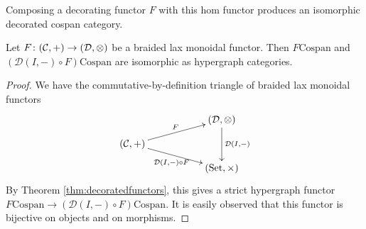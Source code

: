 Composing a decorating functor $F$ with this hom functor produces an isomorphic
decorated cospan category.

\begin{proposition} \label{prop.setdecorations}
  Let $F{\colon} (\mathcal C, +) \to (\mathcal D, \otimes)$ be a braided lax
  monoidal functor. Then $F\mathrm{Cospan}$ and $(\mathcal D(I,-)\circ
  F)\mathrm{Cospan}$ are isomorphic as hypergraph categories.
\end{proposition}
\begin{proof}
  We have the commutative-by-definition triangle of braided lax monoidal
  functors
  \[
    \xymatrixrowsep{2ex}
    \xymatrix{
      && (\mathcal D,\otimes) \ar[dd]^{\mathcal D(I,-)} \\
      (\mathcal C,+) \ar[urr]^{F} \ar[drr]_{\mathcal D(I,-)\circ F} \\
      && (\Set, \times)
    }
  \]
  By Theorem \ref{thm:decoratedfunctors}, this gives a strict hypergraph functor
  $F\mathrm{Cospan} \to (\mathcal D(I,-)\circ F)\mathrm{Cospan}$. It is easily
  observed that this functor is bijective on objects and on morphisms. 
\end{proof}

